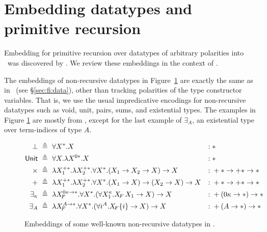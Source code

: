 \section{Embedding datatypes and primitive recursion}
\label{sec:fixi:data}
Embedding for primitive recursion over datatypes of arbitrary polarities into
\Fixi\ was discovered by \citet{AbeMat04}. We review these embeddings
in the context of \Fixi.

The embeddings of non-recursive datatypes in Figure~\ref{fig:fixiNonRecData}
are exactly the same as in \Fi\ (see \S\ref{sec:fi:data}), other than tracking
polarities of the type constructor variables. That is, we use the usual
impredicative encodings for non-recursive datatypes such as void, unit, pairs,
sums, and existential types. The examples in Figure \ref{fig:fixiNonRecData}
are mostly from \citet{AbeMat04}, except for the last example of $\exists_A$,
an existential type over term-indices of type $A$.
\begin{figure}
\begin{singlespace}
\begin{align*}
\bot &~\triangleq~ \forall X^{*}.X
	&:\;& *\\
\textsf{Unit} &~\triangleq~ \forall X.\lambda X^{0*}. X
	&:\;& * \\
\times &~\triangleq~
	\lambda X_1^{+*}.\lambda X_2^{+*}.\forall X^{*}.(X_1 -> X_2 -> X) -> X
	&:\;& +* -> +* -> * \\
+ &~\triangleq~
	\lambda X_1^{+*}.\lambda X_2^{+*}.\forall X^{*}.(X_1 -> X) -> (X_2 -> X) -> X
	&:\;& +* -> +* -> * \\
\exists_\kappa &~\triangleq~
	\lambda X_{\!F}^{0\kappa -> *}.\forall X^{*}.
		(\forall X_1^\kappa.X_{\!F}\,X_1 -> X) -> X
	&:\;& +(0\kappa -> *) -> * \\
\exists_A &~\triangleq~
	\lambda X_{\!F}^{A -> *}.\forall X^{*}.
	(\forall i^A.X_{\!F}\{i\} -> X) -> X
	&:\;& +(A -> *) -> *
\end{align*}
\caption{Embeddings of some well-known non-recursive datatypes in \Fixi.}
\label{fig:fixiNonRecData}
\end{singlespace}
\end{figure}

